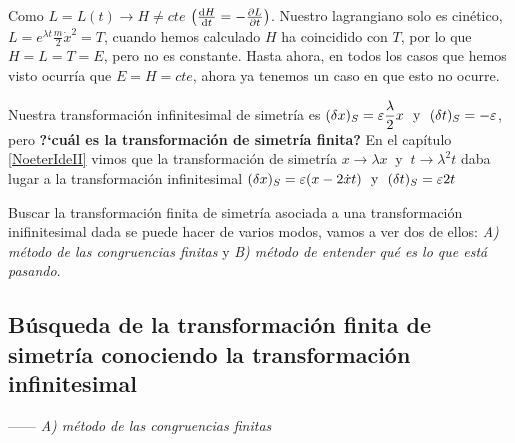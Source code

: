 \begin{ejemplo}
Como $L=L(t) \to H\neq cte$ \textcolor{gris}{$\left(\dv{H}{t}=-\pdv{L}{t} \right)$}. Nuestro lagrangiano solo es cinético, $L=e^{\lambda t} \frac m 2 \dot x^2=T$, cuando hemos calculado $H$ ha coincidido con $T$, por lo que $H=L=T=E$, pero no es constante. Hasta ahora, en todos los casos que hemos visto ocurría que $E=H=cte$, ahora ya tenemos un caso en que esto no ocurre.
\end{ejemplo}


\vspace{5mm} Nuestra transformación infinitesimal de simetría es $(\var x)_S=\varepsilon \dfrac \lambda 2 x \ \text{ y } \ (\var t)_S=-\varepsilon$, pero \textbf{?`cuál es la transformación de simetría finita?} \textcolor{gris}{En el capítulo \ref{NoeterIdeII} vimos que la transformación de simetría $x\to \lambda x \ \text{ y } \ t\to \lambda^2 t$ daba lugar a la transformación infinitesimal $(\var x)_S=\varepsilon (x-2\dot x t) \ \text{ y } \ (\var t)_S=\varepsilon 2 t$} 

Buscar la transformación finita de simetría asociada a una transformación inifinitesimal dada se puede hacer de varios modos, vamos a ver dos de ellos: \emph{A) método de las congruencias finitas} y  \emph{B) método de entender qué es lo que está pasando}.

\vspace{5mm}
\subsection{Búsqueda de la transformación finita de simetría conociendo la transformación infinitesimal}
\vspace{5mm}

------ \emph{A) método de las congruencias finitas} 

